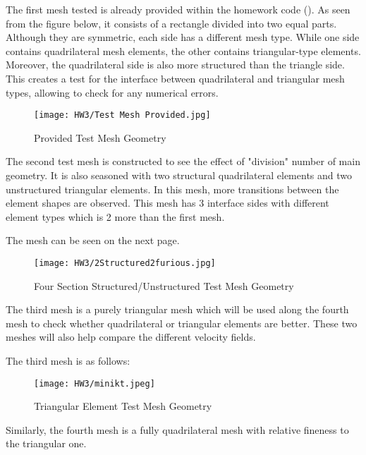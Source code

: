 \documentclass[a4paper, 12pt]{article}
\begin{document}
The first mesh tested is already provided within the homework code (\cite{gi}). As seen from the figure below, it consists of a rectangle divided into two equal parts. Although they are symmetric, each side has a different mesh type. While one side contains quadrilateral mesh elements, the other contains triangular-type elements. Moreover, the quadrilateral side is also more structured than the triangle side. This creates a test for the interface between quadrilateral and triangular mesh types, allowing to check for any numerical errors.

\begin{figure}[h]
    \centering
    \texttt{[image: HW3/Test Mesh Provided.jpg]}
    \caption{Provided Test Mesh Geometry}
\end{figure}\par

The second test mesh is constructed to see the effect of "division" number of main geometry. It is also seasoned with two structural quadrilateral elements and two unstructured triangular elements. In this mesh, more transitions between the element shapes are observed. This mesh has 3 interface sides with different element types which is 2 more than the first mesh. \\\par The mesh can be seen on the next page.

\begin{figure}[H]
    \centering
    \texttt{[image: HW3/2Structured2furious.jpg]}
    \caption{Four Section Structured/Unstructured Test Mesh Geometry}
\end{figure}\par

The third mesh is a purely triangular mesh which will be used along the fourth mesh to check whether quadrilateral or triangular elements are better. These two meshes will also help compare the different velocity fields. \\\par

The third mesh is as follows:

\begin{figure}[H]
    \centering
    \texttt{[image: HW3/minikt.jpeg]}
    \caption{Triangular Element Test Mesh Geometry}
\end{figure}\par

Similarly, the fourth mesh is a fully quadrilateral mesh with relative fineness to the triangular one. \\\par
\end{document}
